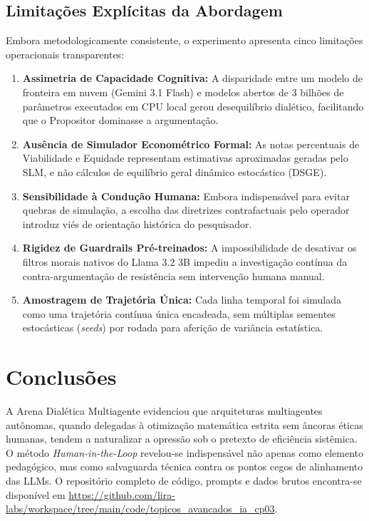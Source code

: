 \documentclass[runningheads]{llncs}
\begin{document}
\subsection{Limita\c{c}\~{o}es Expl\'{i}citas da Abordagem}
Embora metodologicamente consistente, o experimento apresenta cinco limita\c{c}\~{o}es operacionais transparentes:
\begin{enumerate}
    \item \textbf{Assimetria de Capacidade Cognitiva:} A disparidade entre um modelo de fronteira em nuvem (Gemini 3.1 Flash) e modelos abertos de 3 bilh\~{o}es de par\^{a}metros executados em CPU local gerou desequil\'{i}brio dial\'{e}tico, facilitando que o Propositor dominasse a argumenta\c{c}\~{a}o.
    \item \textbf{Aus\^{e}ncia de Simulador Econom\'{e}trico Formal:} As notas percentuais de Viabilidade e Equidade representam estimativas aproximadas geradas pelo SLM, e n\~{a}o c\'{a}lculos de equil\'{i}brio geral din\^{a}mico estoc\'{a}stico (DSGE).
    \item \textbf{Sensibilidade \`{a} Condu\c{c}\~{a}o Humana:} Embora indispens\'{a}vel para evitar quebras de simula\c{c}\~{a}o, a escolha das diretrizes contrafactuais pelo operador introduz vi\'{e}s de orienta\c{c}\~{a}o hist\'{o}rica do pesquisador.
    \item \textbf{Rigidez de Guardrails Pr\'{e}-treinados:} A impossibilidade de desativar os filtros morais nativos do Llama 3.2 3B impediu a investiga\c{c}\~{a}o cont\'{i}nua da contra-argumenta\c{c}\~{a}o de resist\^{e}ncia sem interven\c{c}\~{a}o humana manual.
    \item \textbf{Amostragem de Trajet\'{o}ria \'{U}nica:} Cada linha temporal foi simulada como uma trajet\'{o}ria cont\'{i}nua \'{u}nica encadeada, sem m\'{u}ltiplas sementes estoc\'{a}sticas (\textit{seeds}) por rodada para aferi\c{c}\~{a}o de vari\^{a}ncia estat\'{i}stica.
\end{enumerate}

\section{Conclus\~{o}es}
A Arena Dial\'{e}tica Multiagente evidenciou que arquiteturas multiagentes aut\^{o}nomas, quando delegadas \`{a} otimiza\c{c}\~{a}o matem\'{a}tica estrita sem \^{a}ncoras \'{e}ticas humanas, tendem a naturalizar a opress\~{a}o sob o pretexto de efici\^{e}ncia sist\^{e}mica. O m\'{e}todo \textit{Human-in-the-Loop} revelou-se indispens\'{a}vel n\~{a}o apenas como elemento pedag\'{o}gico, mas como salvaguarda t\'{e}cnica contra os pontos cegos de alinhamento das LLMs. O reposit\'{o}rio completo de c\'{o}digo, prompts e dados brutos encontra-se dispon\'{i}vel em \url{https://github.com/lira-labs/workspace/tree/main/code/topicos_avancados_ia_cp03}.
\end{document}
